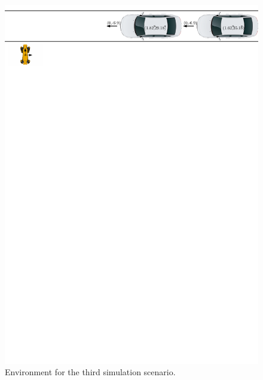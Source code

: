         \\
            \begin{figure}[ht]
                \centering
                \includegraphics[width=\linewidth]{images/simulations/scene3.pdf}
                \caption{Environment for the third simulation scenario.}
                \label{fig:scene3}
            \end{figure}
